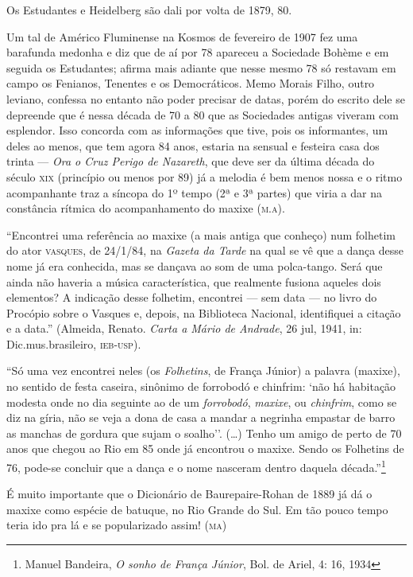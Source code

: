 Os Estudantes e Heidelberg são dali por volta de 1879, 80.

Um tal de Américo Fluminense na Kosmos de fevereiro de 1907 fez uma
barafunda medonha e diz que de aí por 78 apareceu a Sociedade Bohème e
em seguida os Estudantes; afirma mais adiante que nesse mesmo 78 só
restavam em campo os Fenianos, Tenentes e os Democráticos. Memo Morais
Filho, outro leviano, confessa no entanto não poder precisar de datas,
porém do escrito dele se depreende que é nessa década de 70 a 80 que as
Sociedades antigas viveram com esplendor. Isso concorda com as
informações que tive, pois os informantes, um deles ao menos, que tem
agora 84 anos, estaria na sensual e festeira casa dos trinta --- \textit{Ora
o Cruz Perigo de Nazareth}, que deve ser da última década do século \textsc{xix}
(princípio ou menos por 89) já a melodia é bem menos nossa e o ritmo
acompanhante traz a síncopa do 1º tempo (2ª e 3ª partes) que viria a
dar na constância rítmica do acompanhamento do maxixe (\textsc{m.a}).

``Encontrei uma referência ao maxixe (a mais antiga que conheço) num
folhetim do ator \textsc{vasques}, de 24/1/84, na \textit{Gazeta da Tarde} na qual
se vê que a dança desse nome já era conhecida, mas se dançava ao som de
uma polca-tango. Será que ainda não haveria a música característica, que
realmente fusiona aqueles dois elementos? A indicação desse folhetim,
encontrei --- sem data --- no livro do Procópio sobre o Vasques e, depois,
na Biblioteca Nacional, identifiquei a citação e a data.'' (Almeida,
Renato. \textit{Carta a Mário de Andrade}, 26 jul, 1941, in:
Dic.mus.brasileiro, \textsc{ieb-usp}).

``Só uma vez encontrei neles (os \textit{Folhetins}, de França Júnior) a
palavra (maxixe), no sentido de festa caseira, sinônimo de forrobodó e
chinfrim: `não há habitação modesta onde no dia seguinte ao de um
\textit{forrobodó}, \textit{maxixe}, ou \textit{chinfrim}, como se diz na
gíria, não se veja a dona de casa a mandar a negrinha empastar de barro
as manchas de gordura que sujam o soalho''. (\ldots{}) Tenho um amigo de perto
de 70 anos que chegou ao Rio em 85 onde já encontrou o maxixe. Sendo os
Folhetins de 76, pode-se concluir que a dança e o nome nasceram dentro
daquela década.''\footnote{Manuel Bandeira, \textit{O sonho de França Júnior}, Bol. de
Ariel, 4: 16, 1934}

É muito importante que o Dicionário de Baurepaire-Rohan de 1889 já dá o
maxixe como espécie de batuque, no Rio Grande do Sul. Em tão pouco tempo
teria ido pra lá e se popularizado assim! (\textsc{ma})

